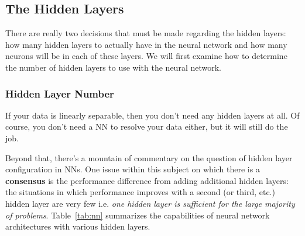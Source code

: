 \documentclass[]{scrartcl}
\begin{document}
\subsection*{The Hidden Layers}

There are really two decisions that must be made regarding the hidden layers: how many hidden layers to actually have in the neural network and how many neurons will be in each of these layers. We will first examine how to determine the number of hidden layers to use with the neural network.

\subsubsection*{Hidden Layer Number}
If your data is linearly separable, then you don't need any hidden layers at all. Of course, you don't need a NN to resolve your data either, but it will still do the job.

Beyond that, there's a mountain of commentary on the question of hidden layer configuration in NNs. One issue within this subject on which there is a \textbf{consensus} is the performance difference from adding additional hidden layers: the situations in which performance improves with a second (or third, etc.) hidden layer are very few i.e. \emph{one hidden layer is sufficient for the large majority of problems}. Table~\ref{tab:nn} summarizes the capabilities of neural network architectures with various hidden layers.

\end{document}
